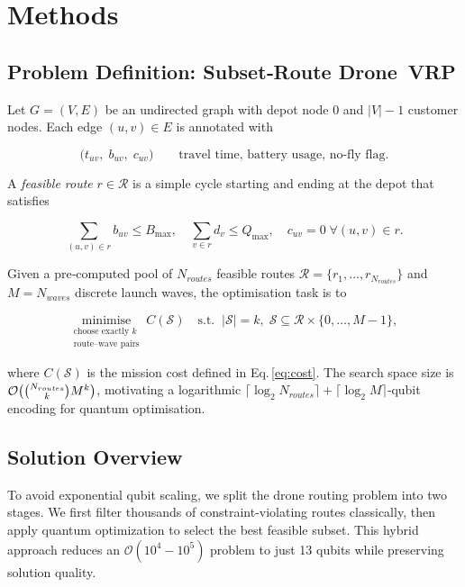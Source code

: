 
\section{Methods}
\label{sec:methods}

\subsection{Problem Definition: Subset‑Route Drone VRP}
\label{sec:problem}

Let $G=(V,E)$ be an undirected graph with depot node $0$ and
$|V|-1$ customer nodes.  Each edge $(u,v)\in E$ is annotated with

\begin{equation}
    \bigl(t_{uv}, \; b_{uv}, \; c_{uv}\bigr)
    \qquad
    \text{travel time, battery usage, no‑fly flag.}
\end{equation}

A \emph{feasible route} $r\in\mathcal{R}$ is a simple cycle starting and
ending at the depot that satisfies

\begin{equation}
    \textstyle
    \sum_{(u,v)\in r} b_{uv} \le B_{\max},
    \quad
    \sum_{v\in r} d_v \le Q_{\max},
    \quad
    c_{uv}=0 \;\forall(u,v)\in r.
\end{equation}

Given a pre‑computed pool of $N_{routes}$ feasible routes
$\mathcal{R}=\{r_1,\dots,r_{N_{routes}}\}$ and $M=N_{waves}$ discrete launch
waves, the optimisation task is to

\[
\underset{
    \substack{\text{choose exactly }k\\ \text{route–wave pairs}}}
    {\text{minimise}}
\; C(\mathcal{S})
\quad
\text{s.t.}
\;\;
|\mathcal{S}|=k,\;
\mathcal{S}\subseteq\mathcal{R}\times\{0,\dots,M-1\},
\]

where $C(\mathcal{S})$ is the mission cost defined in
Eq.\,\eqref{eq:cost}.  The search space size is
$\mathcal{O}\big({\small\binom{N_{routes}}{k} M^{k}}\big)$, motivating a logarithmic
$\lceil\log_2 N_{routes}\rceil+\lceil\log_2 M\rceil$‑qubit encoding for
quantum optimisation.

\subsection{Solution Overview}

To avoid exponential qubit scaling, we split the drone routing problem into two stages. We first filter thousands of constraint-violating routes classically, then apply quantum optimization to select the best feasible subset. This hybrid approach reduces an $\mathcal{O}(10^4 - 10^5)$ problem to just 13 qubits while preserving solution quality.

